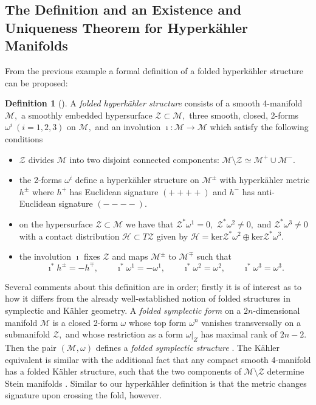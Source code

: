 \documentclass[a4paper,12pt, onecolumn, notitlepage]{article}
\theoremstyle{definition}
\newtheorem{defn}[thm]{Definition}
\theoremstyle{remark}
\newcommand{\w}{\omega}
\newcommand{\K}{K\"ahler }
\newcommand{\HK}{hyperk\"ahler }
\begin{document}
\subsection{The Definition and an Existence and Uniqueness Theorem for Hyperk\"ahler Manifolds}
From the previous example a formal definition of a folded \HK structure can be proposed:\\

\begin{defn}[\cite{hitchin_2015,biquard_2015}]
	\label{hk_def}
	A \emph{folded \HK structure} consists of a smooth 4-manifold $\mathcal{M},$ a smoothly embedded hypersurface $\mathcal{Z}\subset\mathcal{M},$ three smooth, closed, 2-forms $\w^{i}\ (i=1,2,3)$ on $\mathcal{M},$ and an involution $\imath:\mathcal{M}\to\mathcal{M}$ which satisfy the following conditions
	\begin{itemize}
		\item $\mathcal{Z}$ divides $\mathcal{M}$ into two disjoint connected components: $\mathcal{M}\setminus \mathcal{Z}\simeq\mathcal{M}^{+}\cup\mathcal{M}^{-}.$
		\item the 2-forms $\w^{i}$ define a \HK structure on $\mathcal{M}^{\pm}$ with \HK metric $h^{\pm}$ where $h^{+}$ has Euclidean signature $(++++)$ and $h^{-}$ has anti-Euclidean signature $(----).$
		\item on the hypersurface $\mathcal{Z}\subset\mathcal{M}$ we have that $\mathcal{Z}^{\ast}\w^{1}=0,$ $\mathcal{Z}^{\ast}\w^{2}\neq0,$ and $\mathcal{Z}^{\ast}\w^{3}\neq0$ with a contact distribution $\mathcal{H}\subset T\mathcal{Z}$ given by $\mathcal{H}=\text{ker}\mathcal{Z}^{\ast}\w^{2}\oplus\text{ker}\mathcal{Z}^{\ast}\w^{3}.$
		\item the involution $\imath$ fixes $\mathcal{Z}$ and maps $\mathcal{M}^{\pm}$ to $\mathcal{M}^{\mp}$ such that
		\begin{equation}
		\label{def_involution}
		\imath^{\ast}h^{\pm} = -h^{\mp},\qquad \imath^{\ast}\w^{1} = -\w^{1},\qquad \imath^{\ast}\w^{2} = \w^{2},\qquad \imath^{\ast}\w^{3} = \w^{3}.
		\end{equation}
	\end{itemize}
\end{defn}

Several comments about this definition are in order; firstly it is of interest as to how it differs from the already well-established notion of folded structures in symplectic and \K geometry. A \emph{folded symplectic form} on a $2n$-dimensional manifold $\mathcal{M}$ is a closed 2-form $\w$ whose top form $\w^{n}$ vanishes transversally on a submanifold $\mathcal{Z},$ and whose restriction as a form $\left.\w\right|_Z$ has maximal rank of $2n-2$. Then the pair $(\mathcal{M},\w)$ defines a \emph{folded symplectic structure} \cite{dasilva_2000}. The \K equivalent is similar with the additional fact that any compact smooth 4-manifold has a folded \K structure, such that the two components of $\mathcal{M}\setminus\mathcal{Z}$ determine Stein manifolds \cite{hitchin_1987}. Similar to our \HK definition is that the metric changes signature upon crossing the fold, however.\\
\end{document}
